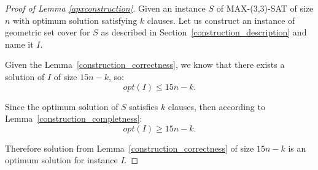 \begin{proof}[Proof of Lemma \ref{apxconstruction}]
Given an instance $S$ of MAX-(3,3)-SAT of size $n$
with optimum solution satisfying $k$ clauses.
Let us construct an instance of geometric set cover for $S$
as described in Section~\ref{construction_description}
and name it $I$.

Given the Lemma~\ref{construction_correctness}, we know
that there exists a solution of $I$ of size $15n-k$, so: 
$$opt(I) \le 15n - k.$$

Since the optimum solution of $S$ satisfies $k$ clauses,
then according to Lemma~\ref{construction_completness}:
$$opt(I) \ge 15n -k.$$

Therefore solution from Lemma~\ref{construction_correctness} 
of size $15n - k$ is an optimum solution for instance $I$.
\end{proof}
